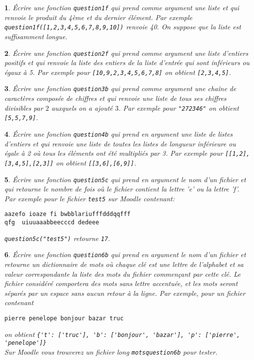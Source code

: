\documentclass[10pt]{article}
\newtheorem{exi}{}
\newenvironment{exo}{\begin{exi}\em}{\end{exi}}
\begin{document}
\begin{exo}
    Écrire une fonction {\tt question1f} qui prend comme argument une liste et
qui renvoie le produit du 4ème et du dernier élément. Par exemple
\verb+question1f([1,2,3,4,5,6,7,8,9,10])+ renvoie 40.
On suppose que la liste est suffisamment longue.
\end{exo}
\vspace*{-2ex}
\begin{exo}
    Écrire une fonction {\tt question2f} qui prend comme argument une liste d'entiers positifs et qui renvoie la liste des entiers de la liste d'entrée qui sont
inférieurs ou égaux à 5. Par exemple pour \verb+[10,9,2,3,4,5,6,7,8]+
on obtient \verb+[2,3,4,5]+.
\end{exo}
\vspace*{-2ex}
\begin{exo}
    Écrire une fonction {\tt question3b} qui prend comme argument une chaîne de
caractères composée de chiffres
et qui renvoie une liste de tous ses chiffres divisibles par $2$
auxquels on a ajouté $3$. Par
exemple pour \verb+"272346"+ on obtient \verb+[5,5,7,9]+.
\end{exo}
\vspace*{-2ex}
\begin{exo}
    Écrire une fonction {\tt question4b} qui prend en argument une liste de listes d'entiers et qui renvoie une liste de toutes les listes
de longueur inférieure ou égale à 2 où tous les éléments ont été multipliés par 3. Par exemple pour \verb+[[1,2],[3,4,5],[2,3]]+ on obtient \verb+[[3,6],[6,9]]+.
\end{exo}
\vspace*{-2ex}
\begin{exo}
    Écrire une fonction {\tt question5c} qui prend en argument le nom d'un fichier et qui retourne le nombre de fois où le fichier contient la lettre 'e' ou la
lettre 'f'.
Par exemple pour le fichier \verb+test5+ sur Moodle contenant: 
\begin{verbatim} 
aazefo ioaze fi bwbblariufffdddqqfff
qfg  uiuuaaabbeecccd dedeee
\end{verbatim} 
\verb+question5c("test5")+ retourne \verb+17+.
\end{exo}
\vspace*{-2ex}
\begin{exo}
    Écrire une fonction \verb+question6b+ qui prend en argument le nom d'un fichier
et retourne un dictionnaire de mots où chaque clé est une lettre de
l'alphabet et sa valeur correspondante la liste des mots du fichier commençant
par cette clé. Le fichier considéré comportera des mots sans lettre accentuée, et les mots seront séparés par un espace sans aucun retour
à la ligne.
Par exemple, pour un fichier contenant
\begin{verbatim}
pierre penelope bonjour bazar truc
\end{verbatim}
on obtient \verb+{'t': ['truc'], 'b': ['bonjour', 'bazar'], 'p': ['pierre', 'penelope']}+\\
Sur Moodle vous trouverez un fichier long \verb+motsquestion6b+ pour tester.
\end{exo}
\end{document}
